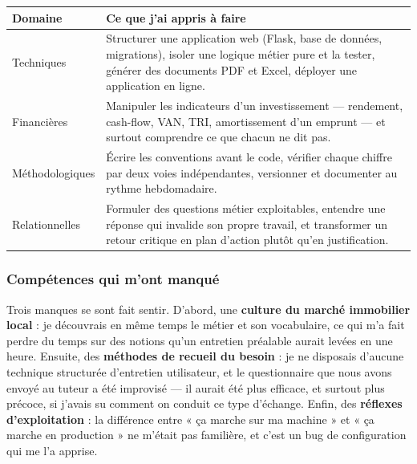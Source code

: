 \documentclass[12pt,a4paper]{article}
\begin{document}
\begin{table}[H]
	\centering
	\small
	\renewcommand{\arraystretch}{1.40}
	\begin{tabular}{|>{\raggedright\arraybackslash}p{4.2cm}|>{\raggedright\arraybackslash}p{10.7cm}|}
		\hline
		\rowcolor{eccblue!15}
		\textbf{\color{eccblue}Domaine} & \textbf{\color{eccblue}Ce que j'ai appris à faire} \\
		\hline
		\rowcolor{white}
		Techniques & Structurer une application web (Flask, base de données,
		migrations), isoler une logique métier pure et la tester, générer des
		documents PDF et Excel, déployer une application en ligne. \\
		\hline
		\rowcolor{gray!8}
		Financières & Manipuler les indicateurs d'un investissement --- rendement,
		cash-flow, VAN, TRI, amortissement d'un emprunt --- et surtout comprendre
		ce que chacun ne dit pas. \\
		\hline
		\rowcolor{white}
		Méthodologiques & Écrire les conventions avant le code, vérifier chaque
		chiffre par deux voies indépendantes, versionner et documenter au rythme
		hebdomadaire. \\
		\hline
		\rowcolor{gray!8}
		Relationnelles & Formuler des questions métier exploitables, entendre une
		réponse qui invalide son propre travail, et transformer un retour critique
		en plan d'action plutôt qu'en justification. \\
		\hline
	\end{tabular}
\end{table}

\subsubsection{Compétences qui m'ont manqué}

Trois manques se sont fait sentir. D'abord, une \textbf{culture du marché
	immobilier local} : je découvrais en même temps le métier et son vocabulaire, ce
qui m'a fait perdre du temps sur des notions qu'un entretien préalable aurait
levées en une heure. Ensuite, des \textbf{méthodes de recueil du besoin} : je ne
disposais d'aucune technique structurée d'entretien utilisateur, et le
questionnaire que nous avons envoyé au tuteur a été improvisé --- il aurait été
plus efficace, et surtout plus précoce, si j'avais su comment on conduit
ce type d'échange. Enfin, des \textbf{réflexes d'exploitation} : la différence
entre « ça marche sur ma machine » et « ça marche en production » ne m'était pas
familière, et c'est un bug de configuration qui me l'a apprise.
\end{document}
